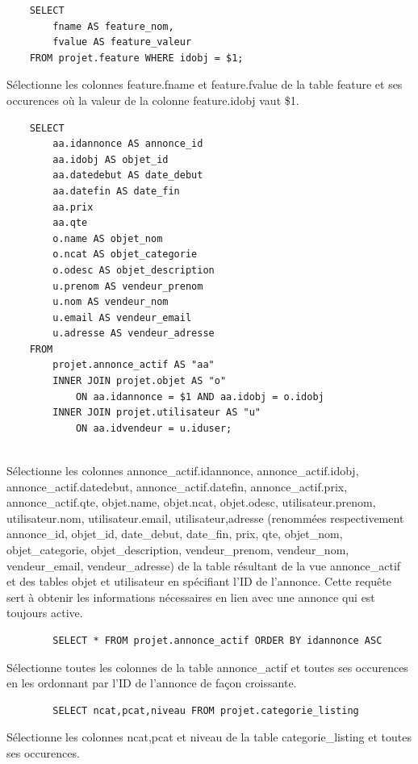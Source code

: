 \documentclass[a4paper,12pt]{article}
\begin{document}
\begin{spacing}{1}
    \begin{verbatim}
    SELECT
	    fname AS feature_nom,
	    fvalue AS feature_valeur
    FROM projet.feature WHERE idobj = $1;
    \end{verbatim}
Sélectionne les colonnes feature.fname et feature.fvalue de la table feature et ses occurences où la valeur de la colonne feature.idobj vaut \$1.

    \begin{verbatim}
    SELECT
        aa.idannonce AS annonce_id
        aa.idobj AS objet_id
        aa.datedebut AS date_debut
        aa.datefin AS date_fin
        aa.prix
        aa.qte
        o.name AS objet_nom
        o.ncat AS objet_categorie
        o.odesc AS objet_description 
        u.prenom AS vendeur_prenom
        u.nom AS vendeur_nom
        u.email AS vendeur_email
        u.adresse AS vendeur_adresse
    FROM
        projet.annonce_actif AS "aa"
        INNER JOIN projet.objet AS "o"
            ON aa.idannonce = $1 AND aa.idobj = o.idobj
        INNER JOIN projet.utilisateur AS "u"
            ON aa.idvendeur = u.iduser;
	
	\end{verbatim}
Sélectionne les colonnes annonce\_actif.idannonce, annonce\_actif.idobj, annonce\_actif.datedebut, annonce\_actif.datefin, annonce\_actif.prix, annonce\_actif.qte, objet.name, objet.ncat, objet.odesc, utilisateur.prenom, utilisateur.nom, utilisateur.email, utilisateur,adresse (renommées respectivement annonce\_id, objet\_id, date\_debut, date\_fin, prix, qte, objet\_nom, objet\_categorie, objet\_description, vendeur\_prenom, vendeur\_nom, vendeur\_email, vendeur\_adresse) de la table résultant de la vue annonce\_actif et des tables objet et utilisateur en spécifiant l'ID de l'annonce.
Cette requête sert à obtenir les informations nécessaires en lien avec une annonce qui est toujours active.

    \begin{verbatim}
        SELECT * FROM projet.annonce_actif ORDER BY idannonce ASC        
    \end{verbatim}
Sélectionne toutes les colonnes de la table annonce\_actif et toutes ses occurences en les ordonnant par l'ID de l'annonce de façon croissante.

    \begin{verbatim}
        SELECT ncat,pcat,niveau FROM projet.categorie_listing
    \end{verbatim}
Sélectionne les colonnes ncat,pcat et niveau de la table categorie\_listing et toutes ses occurences.


\end{spacing}
\end{document}
